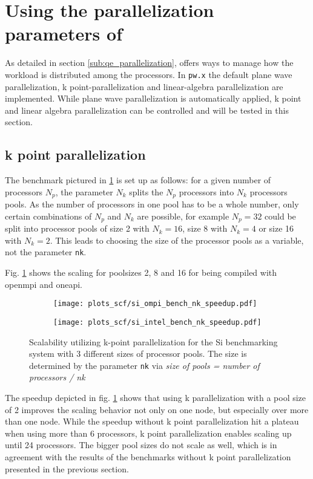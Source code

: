 \documentclass[main.tex]{subfiles}
\begin{document}
\section{Using the parallelization parameters of \QE}

As detailed in section \ref{sub:qe_parallelization}, \QE offers ways to manage how the workload is distributed among the processors.
In \texttt{pw.x} the default plane wave parallelization, k point-parallelization and linear-algebra parallelization are implemented.
While plane wave parallelization is automatically applied, k point and linear algebra parallelization can be controlled and will be tested in this section.

\subsection{k point parallelization}\label{sub:scf_scaling_k_point}

The benchmark pictured in \ref{fig:scaling_scf_nk_si} is set up as follows: for a given number of processors \(N_p\), the parameter \(N_k\) splits the \(N_p\) processors into \(N_k\) processors pools.
As the number of processors in one pool has to be a whole number, only certain combinations of \(N_p\) and \(N_k\) are possible, for example \(N_p = 32\) could be split into processor pools of size 2 with \(N_k = 16\), size 8 with \(N_k = 4\) or size 16 with \(N_k = 2\).
This leads to choosing the size of the processor pools as a variable, not the parameter \texttt{nk}.

Fig. \ref{fig:scaling_scf_nk_si} shows the scaling for poolsizes 2, 8 and 16 for \QE being compiled with \gls{openmpi} and \gls{oneapi}.

\begin{figure}[ht!]
\begin{subfigure}[b]{0.49\textwidth}
    \centering
    \texttt{[image: plots\_scf/si\_ompi\_bench\_nk\_speedup.pdf]}
\end{subfigure}
\begin{subfigure}[b]{0.49\textwidth}
    \centering
    \texttt{[image: plots\_scf/si\_intel\_bench\_nk\_speedup.pdf]}
\end{subfigure}
\caption{Scalability utilizing k-point parallelization for the Si benchmarking system with 3 different sizes of processor pools. The size is determined by the parameter \texttt{nk} via \emph{size of pools = number of processors / nk}}
\label{fig:scaling_scf_nk_si}
\end{figure}
The speedup depicted in fig. \ref{fig:scaling_scf_nk_si} shows that using k parallelization with a pool size of 2 improves the scaling behavior not only on one node, but especially over more than one node.
While the speedup without k point parallelization hit a plateau when using more than 6 processors, k point parallelization enables scaling up until 24 processors.
The bigger pool sizes do not scale as well, which is in agreement with the results of the benchmarks without k point parallelization presented in the previous section.
\end{document}
